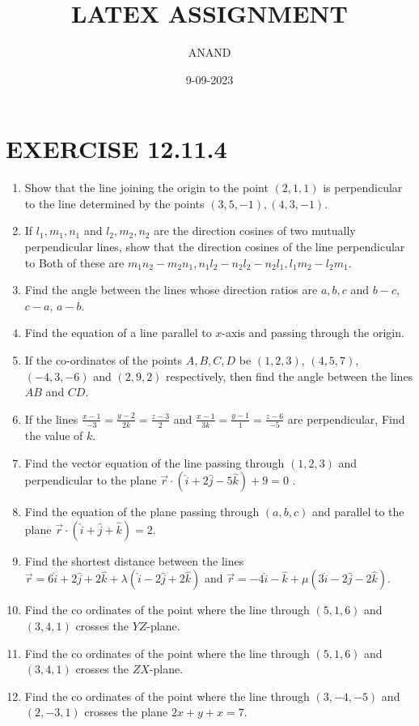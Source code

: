\documentclass{article}
\theoremstyle{remark}
\begin{document}
\title{LATEX ASSIGNMENT}
\author{ANAND}
\date{9-09-2023}
\maketitle
\section*{EXERCISE 12.11.4}
\begin{enumerate}
\item Show that the line joining the origin to the point $(2,1,1)$ is perpendicular to the line determined by the points $(3,5,-1), (4,3,-1)$.
\item If $l_1, m_1, n_1$ and $l_2, m_2, n_2$ are the direction cosines of two mutually perpendicular lines, show that the direction cosines of the line perpendicular to Both of these are $m_1 n_2 - m_2 n_1,  n_1 l_2 - n_2 l_2 - n_2 l_1, l_1 m_2 - l_2 m_1$.
\item Find the angle between the lines whose direction ratios are $a, b, c$ and $b-c$, $c-a$, $a-b$.
\item Find the equation of a line parallel to $x$-axis and passing through the origin.
\item If the co-ordinates of the points $A,B,C,D$ be $(1,2,3)$, $(4,5,7)$, $(-4,3,-6)$ and $(2,9,2)$ respectively, then find the angle between the lines $AB$ and $CD$.
\item If the lines $\frac{x-1}{-3}=\frac{y-2}{2k}=\frac{z-3}{2}$ and $\frac{x-1}{3k}=\frac{y-1}{1}=\frac{z-6}{-5}$ are perpendicular, Find the value of $k$.
\item Find the vector equation of the line passing through $(1,2,3)$ and perpendicular to the plane $\overrightarrow{r}\cdot(\hat{i}+2\hat{j}-5\hat{k})+9=0$ .
\item Find the equation of the plane passing through $(a,b,c)$ and parallel to the plane $\overrightarrow{r} \cdot (\hat{i}+\hat{j}+\hat{k})=2$.
\item Find the shortest distance between the lines $\overrightarrow{r}=6\hat{i}+2\hat{j}+2\hat{k}+\lambda(\hat{i}-2\hat{j}+2\hat{k})$ and $\overrightarrow{r}=-4\hat{i}-\hat{k}+\mu(3\hat{i}-2\hat{j}-2\hat{k})$.
\item Find the co ordinates of the point where the line through $(5,1,6)$ and $(3,4,1)$ crosses the $YZ$-plane.
\item Find the co ordinates of the point where the line through $(5,1,6)$ and $(3,4,1)$ crosses the $ZX$-plane.
\item Find the co ordinates of the point where the line through $(3,-4,-5)$ and $(2,-3,1)$ crosses the plane $2x+y+x=7$.

\end{enumerate}
\end{document}
